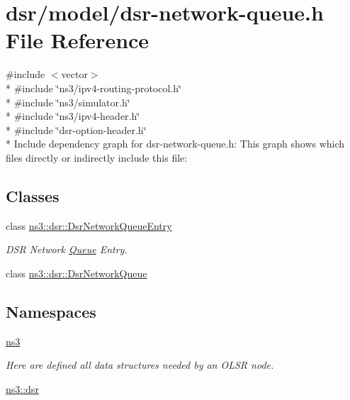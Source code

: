 \hypertarget{dsr-network-queue_8h}{}\section{dsr/model/dsr-\/network-\/queue.h File Reference}
\label{dsr-network-queue_8h}
{\ttfamily \#include $<$vector$>$}\\*
{\ttfamily \#include \char`\"{}ns3/ipv4-\/routing-\/protocol.\+h\char`\"{}}\\*
{\ttfamily \#include \char`\"{}ns3/simulator.\+h\char`\"{}}\\*
{\ttfamily \#include \char`\"{}ns3/ipv4-\/header.\+h\char`\"{}}\\*
{\ttfamily \#include \char`\"{}dsr-\/option-\/header.\+h\char`\"{}}\\*
Include dependency graph for dsr-\/network-\/queue.h\+:
This graph shows which files directly or indirectly include this file\+:
\subsection*{Classes}
\begin{DoxyCompactItemize}
\item 
class \hyperlink{classns3_1_1dsr_1_1DsrNetworkQueueEntry}{ns3\+::dsr\+::\+Dsr\+Network\+Queue\+Entry}
\begin{DoxyCompactList}\small\item\em D\+SR Network \hyperlink{classns3_1_1Queue}{Queue} Entry. \end{DoxyCompactList}\item 
class \hyperlink{classns3_1_1dsr_1_1DsrNetworkQueue}{ns3\+::dsr\+::\+Dsr\+Network\+Queue}
\end{DoxyCompactItemize}
\subsection*{Namespaces}
\begin{DoxyCompactItemize}
\item 
 \hyperlink{namespacens3}{ns3}
\begin{DoxyCompactList}\small\item\em Here are defined all data structures needed by an O\+L\+SR node. \end{DoxyCompactList}\item 
 \hyperlink{namespacens3_1_1dsr}{ns3\+::dsr}
\end{DoxyCompactItemize}
